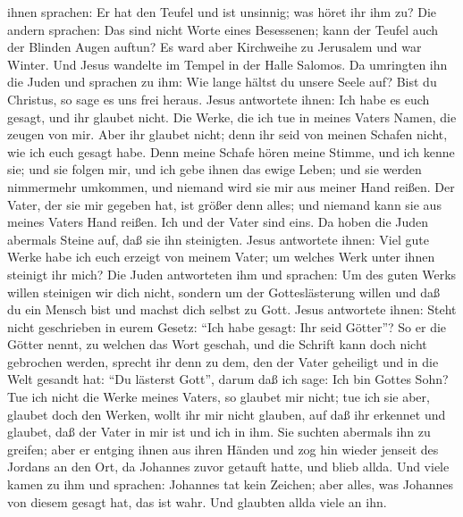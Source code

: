 ihnen sprachen: Er hat den Teufel und ist unsinnig; was höret ihr ihm
zu?  Die andern sprachen: Das sind nicht Worte eines
Besessenen; kann der Teufel auch der Blinden Augen auftun? 
Es ward aber Kirchweihe zu Jerusalem und war Winter.  Und
Jesus wandelte im Tempel in der Halle Salomos.  Da
umringten ihn die Juden und sprachen zu ihm: Wie lange hältst du unsere
Seele auf? Bist du Christus, so sage es uns frei heraus. 
Jesus antwortete ihnen: Ich habe es euch gesagt, und ihr glaubet nicht.
Die Werke, die ich tue in meines Vaters Namen, die zeugen von mir.
 Aber ihr glaubet nicht; denn ihr seid von meinen Schafen
nicht, wie ich euch gesagt habe.  Denn meine Schafe hören
meine Stimme, und ich kenne sie; und sie folgen mir,  und
ich gebe ihnen das ewige Leben; und sie werden nimmermehr umkommen, und
niemand wird sie mir aus meiner Hand reißen.  Der Vater,
der sie mir gegeben hat, ist größer denn alles; und niemand kann sie aus
meines Vaters Hand reißen.  Ich und der Vater sind eins.
 Da hoben die Juden abermals Steine auf, daß sie ihn
steinigten.  Jesus antwortete ihnen: Viel gute Werke habe
ich euch erzeigt von meinem Vater; um welches Werk unter ihnen steinigt
ihr mich?  Die Juden antworteten ihm und sprachen: Um des
guten Werks willen steinigen wir dich nicht, sondern um der
Gotteslästerung willen und daß du ein Mensch bist und machst dich selbst
zu Gott.  Jesus antwortete ihnen: Steht nicht geschrieben
in eurem Gesetz: ``Ich habe gesagt: Ihr seid Götter''?  So
er die Götter nennt, zu welchen das Wort geschah, und die Schrift kann
doch nicht gebrochen werden,  sprecht ihr denn zu dem, den
der Vater geheiligt und in die Welt gesandt hat: ``Du lästerst Gott'',
darum daß ich sage: Ich bin Gottes Sohn?  Tue ich nicht die
Werke meines Vaters, so glaubet mir nicht;  tue ich sie
aber, glaubet doch den Werken, wollt ihr mir nicht glauben, auf daß ihr
erkennet und glaubet, daß der Vater in mir ist und ich in ihm.
 Sie suchten abermals ihn zu greifen; aber er entging ihnen
aus ihren Händen  und zog hin wieder jenseit des Jordans an
den Ort, da Johannes zuvor getauft hatte, und blieb allda. 
Und viele kamen zu ihm und sprachen: Johannes tat kein Zeichen; aber
alles, was Johannes von diesem gesagt hat, das ist wahr. 
Und glaubten allda viele an ihn.

